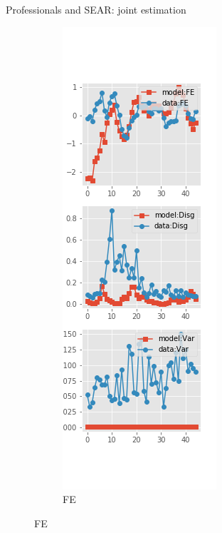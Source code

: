 \documentclass{beamer}
\begin{document}
\begin{frame}{Professionals and SEAR: joint estimation}
	\begin{figure}[ht]
		\label{SE_diag_SPF_joint}
		\begin{subfigure}[b]{0.2\textwidth}
			\centering
			\caption{FE}
			\includegraphics[width=\textwidth, height = 0.8\textheight]{figuresDraft/spf_se_est_joint_diag0.png}

\end{subfigure}
\end{figure}
\end{frame}
\end{document}
